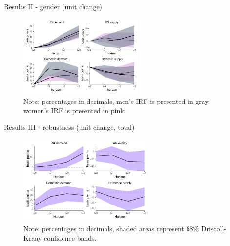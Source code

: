 \documentclass[10pt,leqno,aspectratio=169,presentation]{beamer} %
\begin{document}
\begin{frame}{Results II - gender (unit change)}
\begin{figure}[H]
    \centering    
    \caption{Cumulative impulse responses to demand and supply shocks: Gini (by gender), baseline.}    
    \label{fig:demand_supply_gender_base}
    \includegraphics[width=0.55\textwidth]{Figures/baseline_gender_LP_extended.pdf}
    \centering \caption*{Note: percentages in decimals, men's IRF is presented in gray, women's IRF is presented in pink.}
\end{figure}
\end{frame}

\begin{frame}{Results III - robustness (unit change, total)}
\begin{figure}[H]
    \centering
    \caption{Cumulative impulse responses to demand and supply shocks: Gini (total), robustness.}
    \label{fig:demand_supply_robust}
    \includegraphics[width=0.60\textwidth]{Figures/robust_demand_supply_LP_extended.pdf}
    \centering \caption*{Note: percentages in decimals, shaded areas represent 68\% Driscoll-Kraay confidence bands.}
\end{figure}   
\end{frame}

\end{document}
